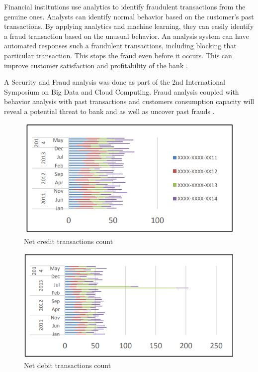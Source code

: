 \documentclass[sigconf]{acmart}
\begin{document}
Financial institutions use analytics to identify fraudulent transactions from the genuine ones. Analysts can identify normal behavior based on the customer's past transactions. By applying analytics and machine learning, they can easily identify a fraud transaction based on the unusual behavior.
An analysis system can have automated responses such a fraudulent transactions, including blocking that particular transaction. This stops the fraud even before it occurs. This can improve customer satisfaction and profitability of the bank \cite{5-big-data-use-cases-in-banking-and-financial-services}.

A Security and Fraud analysis was done as part of the  2nd International Symposium on Big Data and Cloud Computing. Fraud analysis coupled with behavior analysis with past transactions and customers consumption capacity will reveal a potential threat to bank and as well as uncover past frauds \cite{bigdata-banking}. 

\begin{figure}[htb]
  \centering
  \includegraphics[width=1.0\columnwidth]{images/Figure3.png}
  \caption{Net credit transactions count 
  \cite{bigdata-banking}}
  \label{fig:Figure3} 
\end{figure}

\begin{figure}[htb]
  \centering
  \includegraphics[width=1.0\columnwidth]{images/Figure4.png}
  \caption{Net debit transactions count
  \cite{bigdata-banking}}
  \label{fig:Figure4} 
\end{figure}
\end{document}
